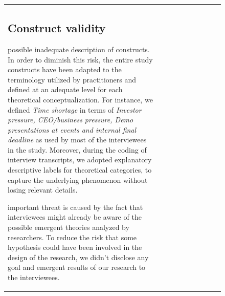 \documentclass[12pt,journal,compsoc]{../sty/IEEEtran}
\begin{document}
\begin{table}[!t]
\begin{figure}[!t]
\begin{compactitem}
\begin{table}[!t]
\begin{tabular}{|l||c||c||c||c||c||c||c||c||c|}
\subsection{Construct validity} %
possible inadequate description of constructs. In  order to diminish this risk,
the entire study constructs have been adapted to  the terminology utilized by
practitioners and defined at an adequate level for  each theoretical
conceptualization. For instance, we defined \textit{Time  shortage} in terms of
\textit{Investor pressure, CEO/business  pressure, Demo presentations at events
and internal final deadline} as used by  most of the interviewees in the study.
Moreover, during the coding of interview transcripts, we adopted explanatory
descriptive labels for theoretical categories, to capture the underlying
phenomenon without losing relevant details.

important threat is caused by the fact that interviewees might  already be aware
of the possible emergent theories analyzed by researchers. To  reduce the risk
that some hypothesis could have been involved in the design of  the research, we
didn't disclose any goal and emergent results of our research to the
interviewees.


\end{tabular}
\end{table}
\end{compactitem}
\end{figure}
\end{table}
\end{document}
